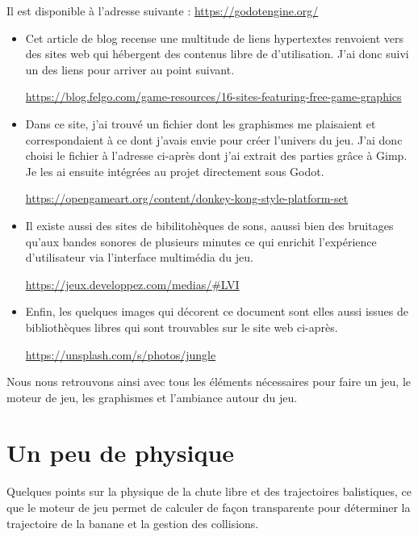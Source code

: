 \documentclass{tstextbook}
\begin{document}
Il est disponible à l'adresse suivante : \url{https://godotengine.org/}

\begin{itemize}
\item Cet article de blog recense une multitude de liens hypertextes renvoient vers des sites web qui hébergent des contenus libre de d'utilisation. J'ai donc suivi un des liens pour arriver au point suivant.

\url{https://blog.felgo.com/game-resources/16-sites-featuring-free-game-graphics}


\item Dans ce site, j'ai trouvé un fichier dont les graphismes me plaisaient et correspondaient à ce dont j'avais envie pour créer l'univers du jeu. J'ai donc choisi le fichier à l'adresse ci-après dont j'ai extrait des parties grâce à Gimp. Je les ai ensuite intégrées au projet directement sous Godot.

\url{https://opengameart.org/content/donkey-kong-style-platform-set}

\item Il existe aussi des sites de bibilitohèques de sons, aaussi bien des bruitages qu'aux bandes sonores de plusieurs minutes ce qui enrichit l'expérience d'utilisateur via l'interface multimédia du jeu.

\url{https://jeux.developpez.com/medias/#LVI}

\item Enfin, les quelques images qui décorent ce document sont elles aussi issues de bibliothèques libres qui sont trouvables sur le site web ci-après.

\url{https://unsplash.com/s/photos/jungle}
\end{itemize}

Nous nous retrouvons ainsi avec tous les éléments nécessaires pour faire un jeu, le moteur de jeu, les graphismes et l'ambiance autour du jeu.

	

	
\chapter{Un peu de physique}
\begin{summary}
Quelques points sur la physique de la chute libre et des trajectoires balistiques, ce que le moteur de jeu permet de calculer de façon transparente pour déterminer la trajectoire de la banane et la gestion des collisions.
\end{summary}
\end{document}
